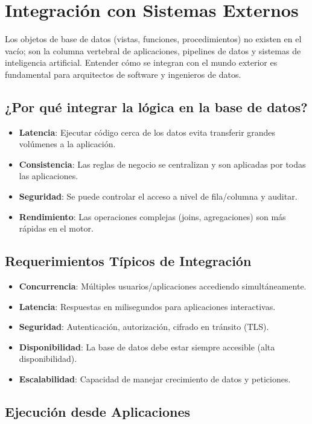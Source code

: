 \documentclass[12pt,a4paper,openany,oneside]{book}
\begin{document}
\chapter{Integración con Sistemas Externos}
Los objetos de base de datos (vistas, funciones, procedimientos) no existen en el vacío; son la columna vertebral de aplicaciones, pipelines de datos y sistemas de inteligencia artificial. Entender cómo se integran con el mundo exterior es fundamental para arquitectos de software y ingenieros de datos.

\section{¿Por qué integrar la lógica en la base de datos?}
\begin{itemize}
    \item \textbf{Latencia}: Ejecutar código cerca de los datos evita transferir grandes volúmenes a la aplicación.
    \item \textbf{Consistencia}: Las reglas de negocio se centralizan y son aplicadas por todas las aplicaciones.
    \item \textbf{Seguridad}: Se puede controlar el acceso a nivel de fila/columna y auditar.
    \item \textbf{Rendimiento}: Las operaciones complejas (joins, agregaciones) son más rápidas en el motor.
\end{itemize}

\section{Requerimientos Típicos de Integración}
\begin{itemize}
    \item \textbf{Concurrencia}: Múltiples usuarios/aplicaciones accediendo simultáneamente.
    \item \textbf{Latencia}: Respuestas en milisegundos para aplicaciones interactivas.
    \item \textbf{Seguridad}: Autenticación, autorización, cifrado en tránsito (TLS).
    \item \textbf{Disponibilidad}: La base de datos debe estar siempre accesible (alta disponibilidad).
    \item \textbf{Escalabilidad}: Capacidad de manejar crecimiento de datos y peticiones.
\end{itemize}

\section{Ejecución desde Aplicaciones}
\end{document}
